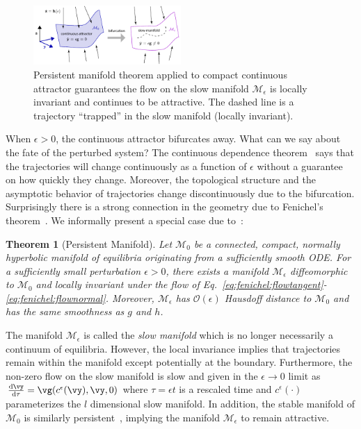 \documentclass{article} %
\newcounter{ct}
\newcommand{\dm}[1]{\ensuremath{\mathrm{d}{#1}}} %
\newcommand{\RN}[2]{\frac{\dm{#1}}{\dm{#2}}} %
\newcommand{\manifold}{\mathcal{M}}
\newtheorem{theorem}{Theorem}
\theoremstyle{definition}
\theoremstyle{remark}
\renewcommand{\cite}{\citep}
\begin{document}
\begin{figure}
  \centering
  \includegraphics[width=0.5\textwidth]{FenichelThm}
  \caption{
    Persistent manifold theorem applied to compact continuous attractor guarantees the flow on the slow manifold \(\manifold_\epsilon\) is locally invariant and continues to be attractive.
    The dashed line is a trajectory ``trapped'' in the slow manifold (locally invariant). %
  }\label{fig:fenichel}
\end{figure}


When \(\epsilon > 0\), the continuous attractor bifurcates away.
What can we say about the fate of the perturbed system?
The continuous dependence theorem~\citep{Chicone2006} says that the trajectories will change continuously as a function of \(\epsilon\) without a guarantee on how quickly they change.
Moreover, the topological structure and the asymptotic behavior of trajectories change discontinuously due to the bifurcation.
Surprisingly there is a strong connection in the geometry due to Fenichel's theorem~\cite{fenichel1971}.
We informally present a special case due to~\citet{Jones1995}:

\begin{theorem}[Persistent Manifold]
Let \(\manifold_0\) be a connected, compact, normally hyperbolic manifold of equilibria originating from a sufficiently smooth ODE.
For a sufficiently small perturbation \(\epsilon > 0\), there exists a manifold \(\manifold_\epsilon\) diffeomorphic to \(\manifold_0\) and locally invariant under the flow of Eq.~\eqref{eq:fenichel:flowtangent}-\eqref{eq:fenichel:flownormal}.
Moreover, \(\manifold_\epsilon\) has \(\mathcal{O}(\epsilon)\) Hausdoff distance to \(\manifold_0\) and has the same smoothness as \(g\) and \(h\). %
\end{theorem}

The manifold \(\manifold_\epsilon\) is called the \emph{slow manifold} which is no longer necessarily a continuum of equilibria.
However, the local invariance implies that trajectories remain within the manifold except potentially at the boundary.
Furthermore, the non-zero flow on the slow manifold is slow and given in the \(\epsilon \to 0\) limit as \(\RN{\vy}{\tau} = \vg(c^\epsilon(\vy), \vy, 0)\) where \(\tau = \epsilon t\) is a rescaled time and \(c^\epsilon(\cdot)\) parameterizes the \(l\) dimensional slow manifold.
In addition, the stable manifold of \(\manifold_0\) is similarly persistent~\cite{Jones1995}, implying the manifold \(\manifold_\epsilon\) to remain attractive.
\end{document}
